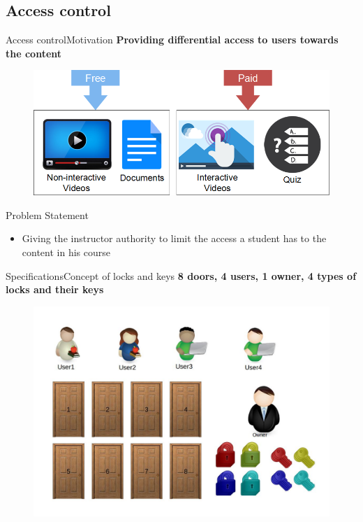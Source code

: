 \documentclass[xcolor=table]{beamer}
\begin{document}
\subsection{Access control}

\begin{frame}{Access control}{Motivation}
	\textbf{Providing differential access to users towards the content}
	\begin{figure}
	\centering
	\includegraphics[width=0.6\linewidth]{media/AccessControl}
	\label{fig:AccessControl}
	\end{figure}
	\begin{block}{Problem Statement}
		\begin{itemize}
			\item Giving the instructor authority to limit the access a student has to the content in his course
		\end{itemize}
	\end{block}
\end{frame}

\begin{frame}{Specifications}{Concept of locks and keys}
	\textbf{8 doors, 4 users, 1 owner, 4 types of locks and their keys}
	\begin{figure}
		\centering
		\includegraphics[width=0.7\linewidth]{./media/1}
		\label{fig:1}
	\end{figure}
\end{frame}
\end{document}
